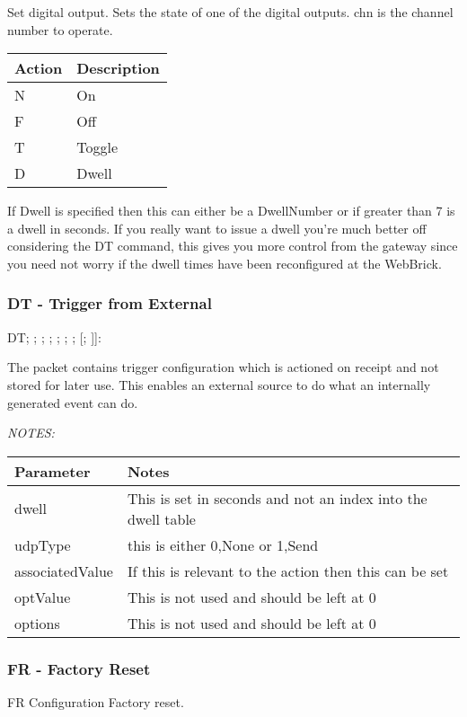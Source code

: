 Set digital output. Sets the state of one of the digital outputs.
chn is the channel number to operate.

\begin{tabular}{l|p{12cm}}
Action&Description\\
\hline
N&On\\
F&Off\\
T&Toggle\\
D&Dwell\\
\end{tabular}

If Dwell is specified then this can either be a DwellNumber  or if greater than 7 is a dwell in seconds.  If you really want to issue a dwell you're much better
off considering the DT command, this gives you more control from the gateway since you need not worry if the dwell times have been reconfigured at the WebBrick.

\subsubsection{DT - Trigger from External}
DT; ; ; ; ; ; ; [; ]]:

The packet contains trigger configuration which is actioned on receipt and not stored for later use. This
enables an external source to do what an internally generated event can do. 

{\em NOTES:}

\begin{tabular}{l|p{12cm}}
Parameter&Notes\\
\hline
dwell&This is set in seconds and not an index into the dwell table\\
udpType& this is either 0,None or 1,Send\\
associatedValue&If this is relevant to the action then this can be set\\
optValue&This is not used and should be left at 0\\
options&This is not used and should be left at 0\\
\end{tabular}



\subsubsection{FR - Factory Reset}
FR  Configuration Factory reset.

